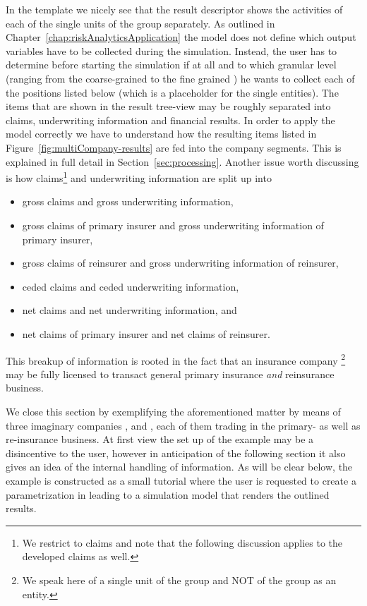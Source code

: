 In the template we nicely see that the result descriptor shows the activities of each of the
single units of the group separately. As outlined in
Chapter~\ref{chap:riskAnalyticsApplication} the model does not define which output variables
have to be collected during the simulation.
Instead, the user has to determine before starting the simulation if at all and to which
granular level (ranging from the coarse-grained  to the fine grained
) he wants to collect each of the positions listed below
 (which is a placeholder for the single entities).
The items that are shown in the result tree-view may be roughly separated into claims,
underwriting information and financial results.
In order to apply the model correctly we have to understand how the resulting items listed
in Figure~\ref{fig:multiCompany-results} are fed into the company segments. This is
explained in full detail in Section~\ref{sec:processing}.
Another issue worth discussing is how claims\footnote{We restrict to claims and
note that the following discussion applies to the developed claims as well.} and
underwriting information are split up into
\begin{itemize}
	\item gross claims and gross underwriting information,
	\item gross claims of primary insurer and gross underwriting information of primary insurer,
	\item gross claims of reinsurer and gross underwriting information of reinsurer,
	\item ceded claims and ceded underwriting information,
	\item net claims and net underwriting information, and
	\item net claims of primary insurer and net claims of reinsurer.
\end{itemize}
This breakup of information is rooted in the fact that an insurance company 
\footnote{We speak here of a single unit of the group and NOT of the group as an entity.} %
may be fully licensed to transact general primary insurance {\em and} reinsurance business.

We close this section by exemplifying the aforementioned matter by means of three imaginary
companies ,  and , each of them trading in the
primary- as well as re-insurance business.
At first view the set up of the example may be a disincentive to the user, however in
anticipation of the following section it also gives an idea of the internal handling of
information. As will be clear below, the example is constructed as a small tutorial where the user 
is requested to create a parametrization in \PillarOne{} leading to a simulation model that renders the 
outlined results. 

